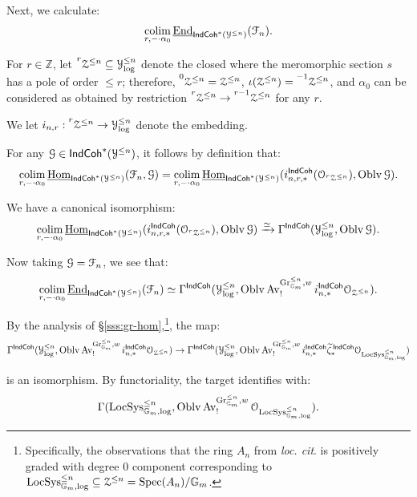 \documentclass[reqno,11pt]{amsart}
\numberwithin{equation}{subsection}
\theoremstyle{remark}
\newcommand{\presup}[1]{\prescript{#1}{}}
\newcommand{\xar}[1]{\xrightarrow{#1}}
\newcommand{\rar}[1]{\xar{#1}}
\newcommand{\isom}{\rar{\simeq}}
\newcommand{\bG}{{\mathbb G}}
\newcommand{\bZ}{{\mathbb Z}}
\newcommand{\sF}{{\EuScript F}}
\newcommand{\sG}{{\EuScript G}}
\newcommand{\sO}{{\EuScript O}}
\newcommand{\sY}{{\EuScript Y}}
\newcommand{\sZ}{{\EuScript Z}}
\newcommand{\on}{\operatorname}
\newcommand{\ul}{\underline}
\newcommand{\End}{\on{End}}
\newcommand{\Hom}{\on{Hom}}
\newcommand{\Spec}{\on{Spec}}
\newcommand{\Gr}{\on{Gr}}
\newcommand{\LocSys}{\on{LocSys}}
\newcommand{\colim}{\on{colim}}
\newcommand{\Oblv}{\on{Oblv}}
\newcommand{\Av}{\on{Av}}
\newcommand{\IndCoh}{\mathsf{IndCoh}}
\renewcommand{\subset}{\subseteq}
\begin{document}
\subsubsection{}

Next, we calculate:
%
\[
\underset{r,-\cdot \alpha_0}{\colim} \, \ul{\End}_{\IndCoh^*(\sY^{\leq n})}(\sF_n).
\]

For $r \in \bZ$, let $\presup{r}{\sZ^{\leq n}} \subset \sY_{\log}^{\leq n}$
denote the closed where the meromorphic section $s$ has a pole of order $\leq r$;
therefore, $\presup{0}{\sZ^{\leq n}} = \sZ^{\leq n}$,
$\iota(\sZ^{\leq n}) = \presup{-1}{\sZ^{\leq n}}$, and $\alpha_0$ can be
considered as obtained by restriction 
$\presup{r}{\sZ^{\leq n}} \to \presup{r-1}{\sZ^{\leq n}}$ for any $r$.

We let $i_{n,r}:\presup{r}{\sZ^{\leq n}} \to \sY_{\log}^{\leq n}$ denote
the embedding.

For any $\sG \in \IndCoh^*(\sY^{\leq n})$, it follows by definition
that:
%
\[
\underset{r,-\cdot \alpha_0}{\colim} \, \ul{\Hom}_{\IndCoh^*(\sY^{\leq n})}(\sF_n,\sG) =
\underset{r,-\cdot \alpha_0}{\colim} \, \ul{\Hom}_{\IndCoh^*(\sY^{\leq n})}
(i_{n,r,*}^{\IndCoh}(\sO_{\presup{r}\sZ^{\leq n}}),\Oblv\sG).
\]

\noindent We have a canonical isomorphism:
%
\[
\underset{r,-\cdot \alpha_0}{\colim} \, \ul{\Hom}_{\IndCoh^*(\sY^{\leq n})}
(i_{n,r,*}^{\IndCoh}(\sO_{\presup{r}\sZ^{\leq n}}),\Oblv\sG) \isom 
\Gamma^{\IndCoh}(\sY_{\log}^{\leq n},\Oblv \sG).
\]

Now taking $\sG = \sF_n$, we see that:
%
\[
\underset{r,-\cdot \alpha_0}{\colim} \, \ul{\End}_{\IndCoh^*(\sY^{\leq n})}(\sF_n)
\simeq \Gamma^{\IndCoh}(\sY_{\log}^{\leq n},\Oblv \Av_!^{\Gr_{\bG_m}^{\leq n},w}
i_{n,*}^{\IndCoh}\sO_{\sZ^{\leq n}}).
\]

By the analysis of \S \ref{sss:gr-hom},\footnote{Specifically, the 
observations that the ring $A_n$ from 
\emph{loc. cit}. is positively graded with degree $0$ component corresponding to
$\LocSys_{\bG_m,\log}^{\leq n} \subset \sZ^{\leq n} = \Spec(A_n)/\bG_m$.}, 
the map:
%
\[
\Gamma^{\IndCoh}(\sY_{\log}^{\leq n},\Oblv \Av_!^{\Gr_{\bG_m}^{\leq n},w}
i_{n,*}^{\IndCoh}\sO_{\sZ^{\leq n}}) \to 
\Gamma^{\IndCoh}(\sY_{\log}^{\leq n},\Oblv \Av_!^{\Gr_{\bG_m}^{\leq n},w}
i_{n,*}^{\IndCoh}\widetilde{\zeta}_*^{\,\IndCoh}\sO_{\LocSys_{\bG_m,\log}^{\leq n}})
\]

\noindent is an isomorphism. By functoriality, the target identifies with:
%
\[
\Gamma(\LocSys_{\bG_m,\log}^{\leq n},
\Oblv \Av_!^{\Gr_{\bG_m}^{\leq n},w}
\sO_{\LocSys_{\bG_m,\log}^{\leq n}}).
\] 
\end{document}
